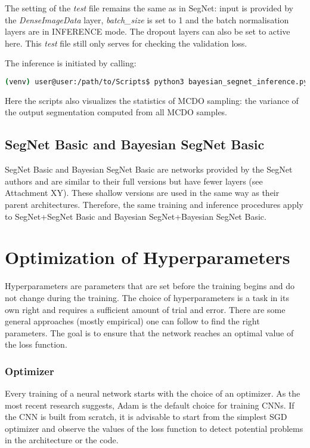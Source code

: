\newpage
The setting of the \textit{test} file remains the same as in SegNet: input is provided by the \textit{DenseImageData} layer, \textit{batch\_size} is set to 1 and the batch normalisation layers are in INFERENCE mode. The dropout layers can also be set to active here. This \textit{test} file still only serves for checking the validation loss.

The inference is initiated by calling:

\begin{lstlisting}[language=bash]
(venv) user@user:/path/to/Scripts$ python3 bayesian_segnet_inference.py /path/to/inference.prototxt /path/to/final_weights.caffemodel /path/to/videofile.avi 
\end{lstlisting}

Here the scripts also visualizes the statistics of MCDO sampling: the variance of the output segmentation computed from all MCDO samples.

\subsection{SegNet Basic and Bayesian SegNet Basic}

SegNet Basic and Bayesian SegNet Basic are networks provided by the SegNet authors and are similar to their full versions but have fewer layers (see Attachment XY). These shallow versions are used in the same way as their parent architectures. Therefore, the same training and inference procedures apply to SegNet+SegNet Basic and Bayesian SegNet+Bayesian SegNet Basic.

\newpage
\section{Optimization of Hyperparameters}

Hyperparameters are parameters that are set before the training begins and do not change during the training. The choice of hyperparameters is a task in its own right and requires a sufficient amount of trial and error. There are some general approaches (mostly empirical) one can follow to find the right parameters. The goal is to ensure that the network reaches an optimal value of the loss function. \cite{stanford-github}

\subsubsection{Optimizer}

Every training of a neural network starts with the choice of an optimizer. As the most recent research suggests, Adam is the default choice for training CNNs. If the CNN is built from scratch, it is advisable to start from the simplest SGD optimizer and observe the values of the loss function to detect potential problems in the architecture or the code. \cite{stanford-L7}


